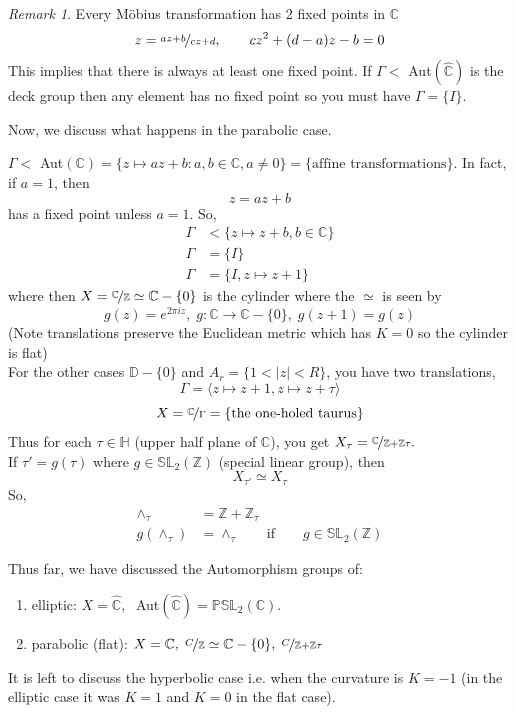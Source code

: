\documentclass[a4paper, 11pt]{book}
\theoremstyle{definition}
\theoremstyle{remark}
\newtheorem*{remark}{Remark}
\begin{document}
    \begin{remark}
        Every Möbius transformation has 2 fixed points in $\mathbb{C}$
        \[ z = \nicefrac{az+b}{cz+d},\qquad cz^2 + (d-a)z - b = 0 \]
        This implies that there is always at least one fixed point. If $\Gamma <$ Aut$(\hat{\mathbb{C}})$ is the deck group
        then any element has no fixed point so you must have $\Gamma = \{ I \}$.
    \end{remark}

    Now, we discuss what happens in the parabolic case.

    $\Gamma <$ Aut$(\mathbb{C}) = \{z\mapsto az+b: a,b\in\mathbb{C}, a\neq 0\} = \{\text{affine transformations}\}$.
    In fact, if $a=1$, then
    \[ z = az+b \]
    has a fixed point unless $a=1$. So,
    \begin{align*}
        \Gamma &< \{z\mapsto z+b, b\in\mathbb{C}\} \\
        \Gamma &= \{I\} \\
        \Gamma &= \{I, z\mapsto z+1\}
    \end{align*}
    where then $X = \nicefrac{\mathbb{C}}{\mathbb{Z}}\simeq \mathbb{C}-\{0\}$ is the cylinder where the $\simeq$ is seen by
    \[ g(z) = e^{2\pi iz},\;g:\mathbb{C}\to\mathbb{C}-\{0\},\; g(z+1) = g(z) \]
    (Note translations preserve the Euclidean metric which has $K=0$ so the cylinder is flat)\\
    For the other cases $\mathbb{D}-\{0\}$ and $A_r = \{1<|z|<R\}$, you have two translations,
    \[ \Gamma = \langle z\mapsto z+1,z\mapsto z+\tau\rangle \]
    \[ X = \nicefrac{\mathbb{C}}{\Gamma} = \{\text{the one-holed taurus}\} \]
    Thus for each $\tau\in\mathbb{H}$ (upper half plane of $\mathbb{C}$), you get $X_{\tau} = 
    \nicefrac{\mathbb{C}}{\mathbb{Z}+\mathbb{Z}\tau}.$\\

    If $\tau' = g(\tau)$ where $g\in\mathbb{SL}_2(\mathbb{Z})$ (special linear group), then
    \[ X_{\tau'} \simeq X_{\tau} \]
    So,
    \begin{align*}
        \wedge_{\tau} &= \mathbb{Z} + \mathbb{Z}_{\tau} \\
        g(\wedge_{\tau}) &= \wedge_{\tau}\qquad\text{if}\qquad g\in\mathbb{SL}_2(\mathbb{Z})
    \end{align*}

    Thus far, we have discussed the Automorphism groups of:
    \begin{enumerate}
        \item elliptic: $X = \hat{\mathbb{C}},\;$ Aut$(\hat{\mathbb{C}}) = \mathbb{PSL}_2(\mathbb{C})$.
        \item parabolic (flat): $X = \mathbb{C},\; \nicefrac{C}{\mathbb{Z}} \simeq \mathbb{C}-\{0\},\; 
                \nicefrac{C}{\mathbb{Z}+\mathbb{Z}\tau}$
    \end{enumerate}
    It is left to discuss the hyperbolic case i.e. when the curvature is $K = -1$ (in the elliptic case it was $K=1$ and $K=0$
    in the flat case).\\
\end{document}
